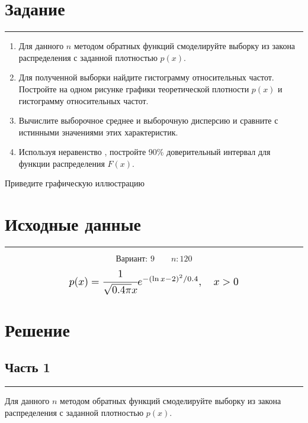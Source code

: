 \documentclass[a4paper, 14pt]{extarticle}
\begin{document}
\lstset{style=mystyle, extendedchars=\true}


\section{Задание}\vspace{-20pt}\rule{\linewidth}{0.1mm}

\begin{enumerate}
  \item Для данного $n$ методом обратных функций смоделируйте выборку 
  из закона распределения с заданной плотностью  $p(x)$.
  \item Для полученной выборки найдите гистограмму относительных частот. 
  Постройте на одном рисунке графики теоретической плотности $p(x)$ и 
  гистограмму относительных частот.
  \item Вычислите выборочное среднее и выборочную дисперсию и сравните с 
  истинными значениями этих характеристик.
  \item Используя неравенство , 
  постройте 90\% доверительный интервал для функции распределения $F(x)$.
\end{enumerate}

Приведите графическую иллюстрацию

\section{Исходные данные}\vspace{-20pt}\rule{\linewidth}{0.1mm}

\begin{equation*}
  \text{Вариант: }9 \qquad n: 120
\end{equation*}
\begin{equation}
  \scalebox{1.25}{$p(x) = \cfrac{1}{\sqrt{0.4 \pi}x} e^{-(\ln{x} - 2)^2 / 0.4}, \quad x > 0$}
\end{equation}

\section{Решение}

\subsection{Часть 1}\vspace{-20pt}\rule{\linewidth}{0.1mm}
Для данного $n$ методом обратных функций смоделируйте выборку 
из закона распределения с заданной плотностью  $p(x)$.\\
\end{document}
